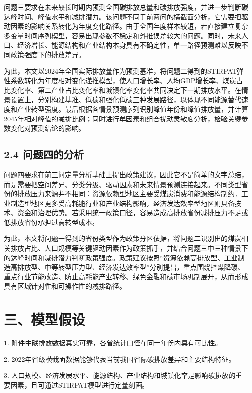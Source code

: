 \documentclass[UTF8,zihao=-4,fontset=windows]{ctexart}
\begin{document}
问题三要求在未来较长时期内预测全国碳排放总量和碳排放强度，并进一步判断碳达峰时间、峰值水平和减排潜力。该问题不同于前两问的横截面分析，它需要把驱动因素的影响关系转化为年度变化路径。由于全国年度样本较短，若直接建立复杂多变量时间序列模型，容易出现参数不稳定和外推误差较大的问题。同时，未来人口、经济增长、能源结构和产业结构本身具有不确定性，单一路径预测难以反映不同政策强度下的排放差异。

为此，本文以2024年全国实际排放量作为预测基准，将问题二得到的STIRPAT弹性系数转化为年度相对变化递推模型，使人口增长率、人均GDP增长率、煤炭占比变化率、第二产业占比变化率和城镇化率变化率共同决定下一期排放水平。在情景设置上，分别构建基准、低碳和强化低碳三种发展路径，以体现不同能源替代速度和产业转型强度。最后根据各情景预测序列识别峰值年份和峰值排放量，并计算2045年相对峰值的减排比例；同时进行单因素和组合扰动灵敏度分析，检验关键参数变化对预测结论的影响。

\subsection*{2.4 问题四的分析}

问题四要求在前三问定量分析基础上提出政策建议，因此它不是简单的文字总结，而是需要把空间差异、分类分级、驱动因素和未来情景预测连接起来。不同类型省份的排放压力来源并不相同：资源依赖型地区主要受煤炭消费和能源结构制约，工业制造型地区更多受高耗能行业和产业结构影响，经济发达效率型地区则具备技术、资金和治理优势。若采用统一政策口径，容易造成高排放省份减排压力不足或低排放省份承担过高转型成本。

为此，本文将问题一得到的省份类型作为政策分区依据，将问题二识别出的煤炭相关排放占比、人口规模等关键驱动因素作为政策抓手，并结合问题三中三种情景下的达峰时间和减排潜力判断政策强度。政策建议按照“资源依赖高排放型、工业制造高排放型、中等转型压力型、经济发达效率型”分别提出，重点围绕控煤降碳、重点行业节能改造、防止高耗能产业转移、绿色金融和碳市场机制展开，从而形成具有区域针对性和可操作性的减排路径。

\section*{三、模型假设}

1. 附件中碳排放数据真实可靠，各省统计口径在同一年份内具有可比性。

2. 2022年省级横截面数据能够代表当前我国省际碳排放差异和主要结构特征。

3. 人口规模、经济发展水平、能源结构、产业结构和城镇化率是影响碳排放的重要因素，且可通过STIRPAT模型进行定量刻画。
\end{document}
